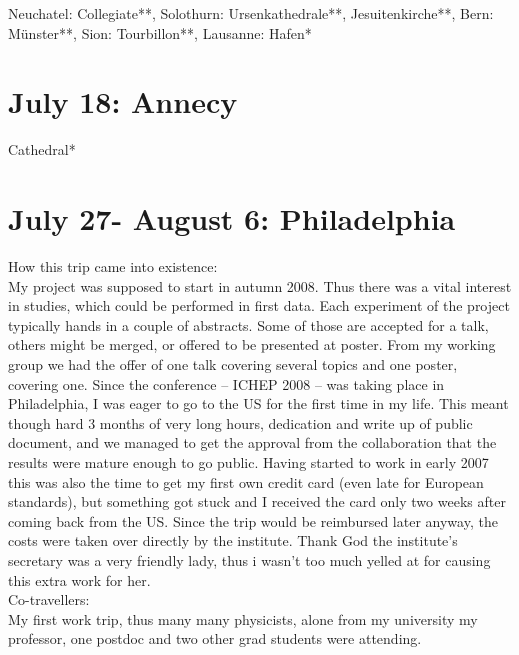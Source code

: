 Neuchatel: Collegiate**, Solothurn: Ursenkathedrale**, Jesuitenkirche**, Bern: M\"unster**, Sion: Tourbillon**, Lausanne: Hafen*

\section{July 18: Annecy}
\label{2008:Annecy}

Cathedral*

\section{July 27- August 6: Philadelphia}
\label{2008:Philadelphia}

How this trip came into existence:\\
My project was supposed to start in autumn 2008. Thus there was a vital interest in studies, which could be performed in first data. Each experiment of the project typically hands in a couple of abstracts. Some of those are accepted for a talk, others might be merged, or offered to be presented at poster. From my working group we had the offer of one talk covering several topics and one poster, covering one. Since the conference -- ICHEP 2008 -- was taking place in Philadelphia, I was eager to go to the US for the first time in my life. This meant though hard 3 months of very long hours, dedication and write up of public document, and we managed to get the approval from the collaboration that the results were mature enough to go public. Having started to work in early 2007 this was also the time to get my first own credit card (even late for European standards), but something got stuck and I received the card only two weeks after coming back from the US. Since the trip would be reimbursed later anyway, the costs were taken over directly by the institute. Thank God the institute's secretary was a very friendly lady, thus i wasn't too much yelled at for causing this extra work for her.\\

Co-travellers:\\
My first work trip, thus many many physicists, alone from my university my professor, one postdoc and two other grad students were attending.\\ 

